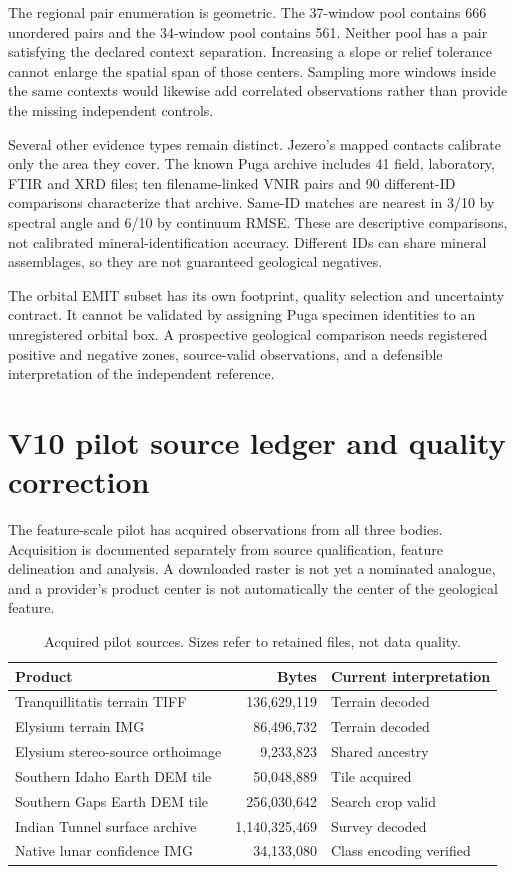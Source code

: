 \documentclass{article}
\begin{document}
The regional pair enumeration is geometric. The 37-window pool contains 666 unordered pairs and the 34-window pool contains 561. Neither pool has a pair satisfying the declared context separation. Increasing a slope or relief tolerance cannot enlarge the spatial span of those centers. Sampling more windows inside the same contexts would likewise add correlated observations rather than provide the missing independent controls.

Several other evidence types remain distinct. Jezero's mapped contacts calibrate only the area they cover. The known Puga archive includes 41 field, laboratory, FTIR and XRD files; ten filename-linked VNIR pairs and 90 different-ID comparisons characterize that archive. Same-ID matches are nearest in 3/10 by spectral angle and 6/10 by continuum RMSE. These are descriptive comparisons, not calibrated mineral-identification accuracy. Different IDs can share mineral assemblages, so they are not guaranteed geological negatives.

The orbital EMIT subset has its own footprint, quality selection and uncertainty contract. It cannot be validated by assigning Puga specimen identities to an unregistered orbital box. A prospective geological comparison needs registered positive and negative zones, source-valid observations, and a defensible interpretation of the independent reference.

\clearpage
\section{V10 pilot source ledger and quality correction}
\label{app:pilot}
The feature-scale pilot has acquired observations from all three bodies. Acquisition is documented separately from source qualification, feature delineation and analysis. A downloaded raster is not yet a nominated analogue, and a provider's product center is not automatically the center of the geological feature.

\begin{table}[h]
\centering\small
\caption{Acquired pilot sources. Sizes refer to retained files, not data quality.}
\begin{tabular}{p{.55\linewidth}rp{.23\linewidth}}
\toprule
Product & Bytes & Current interpretation\\
\midrule
Tranquillitatis terrain TIFF & 136,629,119 & Terrain decoded\\
Elysium terrain IMG & 86,496,732 & Terrain decoded\\
Elysium stereo-source orthoimage & 9,233,823 & Shared ancestry\\
Southern Idaho Earth DEM tile & 50,048,889 & Tile acquired\\
Southern Gaps Earth DEM tile & 256,030,642 & Search crop valid\\
Indian Tunnel surface archive & 1,140,325,469 & Survey decoded\\
Native lunar confidence IMG & 34,133,080 & Class encoding verified\\
\bottomrule
\end{tabular}
\end{table}
\end{document}
